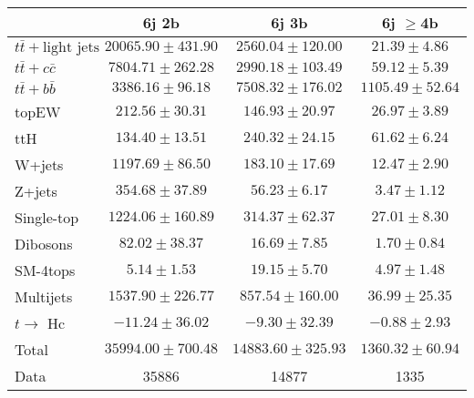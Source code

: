 \begin{table}
\begin{center}
  \begin{tabular}{ | l |  c |  c |  c | }
    \hline \hline 
     & 6j 2b  & 6j 3b  & 6j $\geq$4b  \\ 
    \hline 
     $t\bar{t}+\text{light jets}$  &   $ 20065.90 \pm 431.90 $ &   $ 2560.04 \pm 120.00 $ &   $ 21.39 \pm 4.86 $ \\ 
     $t\bar{t}+c\bar{c}$  &   $ 7804.71 \pm 262.28 $ &   $ 2990.18 \pm 103.49 $ &   $ 59.12 \pm 5.39 $ \\ 
     $t\bar{t}+b\bar{b}$  &   $ 3386.16 \pm 96.18 $ &   $ 7508.32 \pm 176.02 $ &   $ 1105.49 \pm 52.64 $ \\ 
    topEW  &   $ 212.56 \pm 30.31 $ &   $ 146.93 \pm 20.97 $ &   $ 26.97 \pm 3.89 $ \\ 
    ttH  &   $ 134.40 \pm 13.51 $ &   $ 240.32 \pm 24.15 $ &   $ 61.62 \pm 6.24 $ \\ 
    W+jets  &   $ 1197.69 \pm 86.50 $ &   $ 183.10 \pm 17.69 $ &   $ 12.47 \pm 2.90 $ \\ 
    Z+jets  &   $ 354.68 \pm 37.89 $ &   $ 56.23 \pm 6.17 $ &   $ 3.47 \pm 1.12 $ \\ 
    Single-top  &   $ 1224.06 \pm 160.89 $ &   $ 314.37 \pm 62.37 $ &   $ 27.01 \pm 8.30 $ \\ 
    Dibosons  &   $ 82.02 \pm 38.37 $ &   $ 16.69 \pm 7.85 $ &   $ 1.70 \pm 0.84 $ \\ 
    SM-4tops  &   $ 5.14 \pm 1.53 $ &   $ 19.15 \pm 5.70 $ &   $ 4.97 \pm 1.48 $ \\ 
    Multijets  &   $ 1537.90 \pm 226.77 $ &   $ 857.54 \pm 160.00 $ &   $ 36.99 \pm 25.35 $ \\ 
     $t\rightarrow$ Hc  &   $ -11.24 \pm 36.02 $ &   $ -9.30 \pm 32.39 $ &   $ -0.88 \pm 2.93 $ \\ 
    Total  &   $ 35994.00 \pm 700.48 $ &   $ 14883.60 \pm 325.93 $ &   $ 1360.32 \pm 60.94 $ \\ 
    \hline 
    Data  & 35886  & 14877  & 1335  \\ 
    \hline \hline 
  \end{tabular} 


\end{center}
\end{table}
